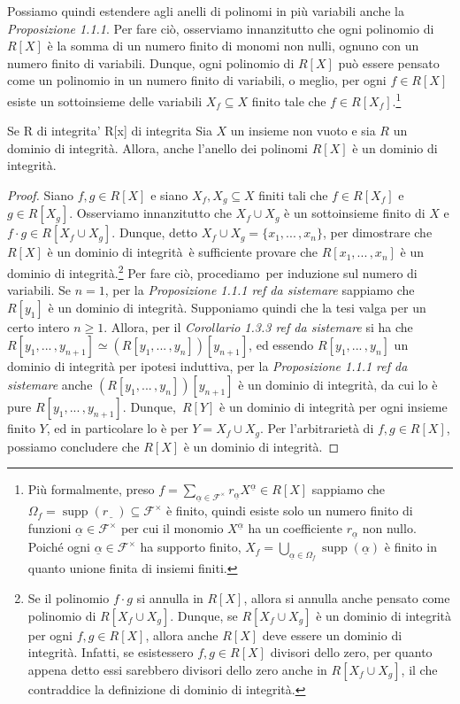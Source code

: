 \noindent Possiamo quindi estendere agli anelli di polinomi in più variabili anche la \emph{Proposizione 1.1.1}. Per fare ciò, osserviamo innanzitutto che ogni polinomio di $R[X]$ è la somma di un numero finito di monomi non nulli, ognuno con un numero finito di variabili. Dunque, ogni polinomio di $R[X]$ può essere pensato come un polinomio in un numero finito di variabili, o meglio, per ogni $f\in R[X]$ esiste un sottoinsieme delle variabili $X_f\subseteq X$ finito tale che $f\in R[X_f]$.\footnote{Più formalmente, preso $f=\sum\limits_{\underline{\alpha}\in \mathcal{F}^{\times}}r_{\underline{\alpha}} X^{\underline{\alpha}}\in R[X]$ sappiamo che $\Omega_f=\operatorname{supp}(r\underline{\, \, \,}\,)\subseteq \mathcal{F}^{\times}$ è finito, quindi esiste solo un numero finito di funzioni $\underline{\alpha}\in \mathcal{F}^{\times}$ per cui il monomio $X^{\underline{\alpha}}$ ha un coefficiente $r_{\underline{\alpha}}$ non nullo. Poiché ogni $\underline{\alpha}\in \mathcal{F}^{\times}$ ha supporto finito, $X_f=\bigcup\limits_{\underline{\alpha}\in \Omega_f}\operatorname{supp}(\underline{\alpha})$ è finito in quanto unione finita di insiemi finiti.}

\begin{prop}[]{Se R di integrita' R[x] di integrita}
  Sia $X$ un insieme non vuoto e sia $R$ un dominio di integrità. Allora, anche l'anello dei polinomi $R[X]$ è un dominio di integrità.
\end{prop}
\vspace{-4mm}
\begin{proof}
  Siano $f,g\in R[X]$ e siano $X_f, X_g\subseteq X$ finiti tali che $f\in R[X_f]$ e $g\in R[X_g]$. 
  Osserviamo innanzitutto che $X_f\cup X_g$ è un sottoinsieme finito di $X$ e $f\cdot g\in R[X_f\cup X_g]$. 
  Dunque, detto $X_f\cup X_g=\{x_1,...\,,x_n\}$, per dimostrare che $R[X]$ è un dominio di integrità~è sufficiente provare che 
  $R[x_1,...\,,x_n]$ è un dominio di integrità.\footnote{Se il polinomio $f\cdot g$ si annulla in $R[X]$, 
  allora si annulla anche pensato come polinomio di $R[X_f\cup X_g]$. Dunque, se $R[X_f\cup X_g]$ è un dominio di integrità per ogni $f,g\in R[X]$, 
  allora anche $R[X]$ deve essere un dominio di integrità. Infatti, se esistessero $f,g\in R[X]$ divisori dello zero, 
  per quanto appena detto essi sarebbero divisori dello zero anche in $R[X_f\cup X_g]$, il che contraddice la definizione di dominio di integrità.}
  Per fare ciò, procediamo~per induzione sul numero di variabili. Se $n=1$, per la \emph{Proposizione 1.1.1 ref da sistemare} 
  sappiamo che $R[y_1]$ è un dominio di integrità. Supponiamo quindi che la tesi valga per un certo intero $n\geq 1$. Allora, per il 
  \emph{Corollario 1.3.3 ref da sistemare} si ha che $R[y_1,...\,,y_{n+1}]\simeq (R[y_1,...\,,y_n])[y_{n+1}]$, 
  ed essendo $R[y_1,...\,,y_n]$ un dominio di integrità per ipotesi induttiva, per la 
  \emph{Proposizione 1.1.1 ref da sistemare} anche $(R[y_1,...\,,y_n])[y_{n+1}]$ è un dominio di integrità, da cui lo è pure $R[y_1,...\,,y_{n+1}]$. 
  Dunque,~$R[Y]$ è un dominio di integrità per ogni insieme finito $Y$, ed in particolare lo è per $Y=X_f\cup X_g$. 
  Per l'arbitrarietà di $f,g\in R[X]$, possiamo concludere che $R[X]$ è un dominio di integrità.
\end{proof}

